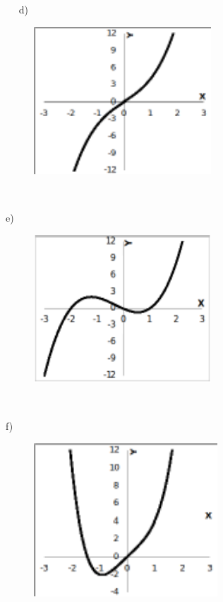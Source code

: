 \begin{respostas}{4}
~~
	d)

	\begin{figure}[H]
		\begin{Center}
			\includegraphics[width=2.61in,height=2.17in]{capitulos/outras_funcoes/media/image63.pdf}
		\end{Center}
	\end{figure}

~~

	e)

	\begin{figure}[H]
		\begin{Center}
			\includegraphics[width=2.61in,height=2.17in]{capitulos/outras_funcoes/media/image64.pdf}
		\end{Center}
	\end{figure}

~~

	f)

	\begin{figure}[H]
		\begin{Center}
			\includegraphics[width=2.71in,height=2.25in]{capitulos/outras_funcoes/media/image65.pdf}
		\end{Center}
	\end{figure}


\end{respostas}
